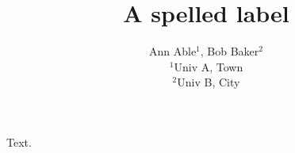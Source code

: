\documentclass{article}
\makeatletter
\providecommand\lx@add@creator[2][]{#2}
\providecommand\lx@add@affiliation[2][]{}
\makeatother
\begin{document}
\title{A spelled label}
\makeatletter
\author{Ann Able$^{1}$, \lx@add@creator[role=editor,annotations={\rm Ed Office}]{Bob Baker}$^{2}$\\
$^{1}$Univ A, Town\\ $^{2}$Univ B, City}
\lx@add@affiliation[label={\rm Ed Office}]{Editorial Office}
\makeatother
\maketitle
Text.
\end{document}
